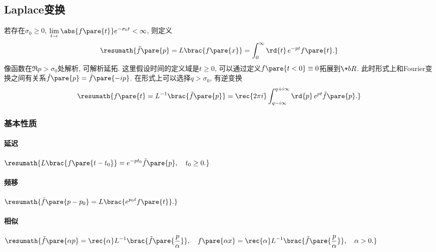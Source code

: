 \documentclass[hidelinks]{ctexart}
\begin{document}

\subsection{Laplace变换} %
\label{sub:laplace变换}

\newpoint{}若存在$\sigma_0 \ge 0$, $\displaystyle \lim_{t\rightarrow} \abs{f\pare{t}} e^{-\sigma_0 t} < \infty$, 则定义
\[ \resumath{\tilde{f}\pare{p} = L\brac{f\pare{x}} = \int_0^\infty\rd{t}\, e^{-pt}f\pare{t}.} \]
\newpoint{}像函数在$\Re p > \sigma_0$处解析, 可解析延拓.
\newpoint{}这里假设时间的定义域是$t\ge 0$, 可以通过定义$f\pare{t<0}\equiv 0$拓展到$\+bR$. 此时形式上和Fourier变换之间有关系$\tilde{f}\pare{p} = \hat f\pare{-ip}$.
\newpoint{}在形式上可以选择$q > \sigma_0$, 有逆变换
\[ \resumath{f\pare{t} = L^{-1}\brac{\tilde{f}\pare{p}} = \rec{2\pi i}\int_{q-i \infty}^{q+i\infty} \rd{p}\, e^{pt} \tilde{f}\pare{p}.} \]

\subsubsection{基本性质} %
\label{ssub:基本性质}

\paragraph{延迟} %
\label{par:延迟}

$\displaystyle \resumath{L\brac{f\pare{t-t_0}} = e^{-pt_0}\tilde{f}\pare{p},\quad t_0 \ge 0.}$


\paragraph{频移} %
\label{par:频移}

$\displaystyle \resumath{\tilde{f}\pare{p-p_0} = L\brac{e^{p_0 t}f\pare{t}}.}$


\paragraph{相似} %
\label{par:相似}

$\displaystyle \resumath{\tilde{f}\pare{\alpha p} = \rec{\alpha}L^{-1}\brac{\tilde{f}\pare{\frac{p}{\alpha}}},\quad f\pare{\alpha x} = \rec{\alpha} L^{-1}\brac{\tilde{f}\pare{\frac{p}{\alpha}}},\quad \alpha > 0.} $
\end{document}
